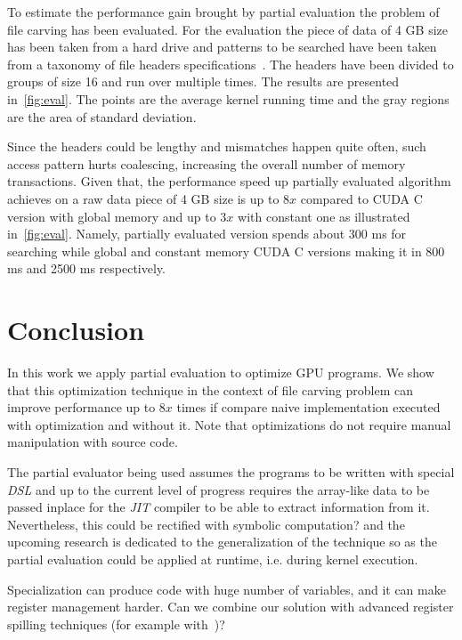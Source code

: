 \documentclass[sigplan,review,anonymous]{acmart}\settopmatter{printfolios=true,printccs=false,printacmref=false}
\newcommand\todo[1]{{\color{red}#1}}
\begin{document}
To estimate the performance gain brought by partial evaluation the problem of file carving has been evaluated.
For the evaluation the piece of data of 4 GB size has been taken from a hard drive and patterns to be searched have been taken from a taxonomy of file headers specifications~\cite{Headers}.
The headers have been divided to groups of size 16 and run over multiple times.
The results are presented in~\ref{fig:eval}.
The points are the average kernel running time and the gray regions are the area of standard deviation.   

Since the headers could be lengthy and mismatches happen quite often, such access pattern hurts coalescing, increasing the overall number of memory transactions. 
Given that, the performance speed up partially evaluated algorithm achieves on a raw data piece of 4 GB size is up to $8x$ compared to CUDA C version with global memory and up to $3x$ with constant one as illustrated in~\ref{fig:eval}. Namely, partially evaluated version spends about 300 ms for searching while global and constant memory CUDA C versions making it in 800 ms and 2500 ms respectively.  



\section{Conclusion}
In this work we apply partial evaluation to optimize GPU programs.
We show that this optimization technique in the context of file carving problem can improve performance up to $8x$ times if compare naive implementation executed with optimization and without it.
Note that optimizations do not require manual manipulation with source code.
    
The partial evaluator being used assumes the programs to be written with special \textit{DSL} and up to the current level of progress requires the array-like data to be passed \todo{inplace} for the \textit{JIT} compiler to be able to extract information from it. Nevertheless, this could be \todo{rectified} with \todo{symbolic computation?} and the upcoming research is dedicated to the generalization of the technique so as the partial evaluation could be applied at runtime, i.e. during kernel execution.

Specialization can produce code with huge number of variables, and it can make register management harder. 
Can we combine our solution with advanced register spilling techniques (for example with~\cite{Sakdhnagool2019RegDemIG})?
\end{document}
